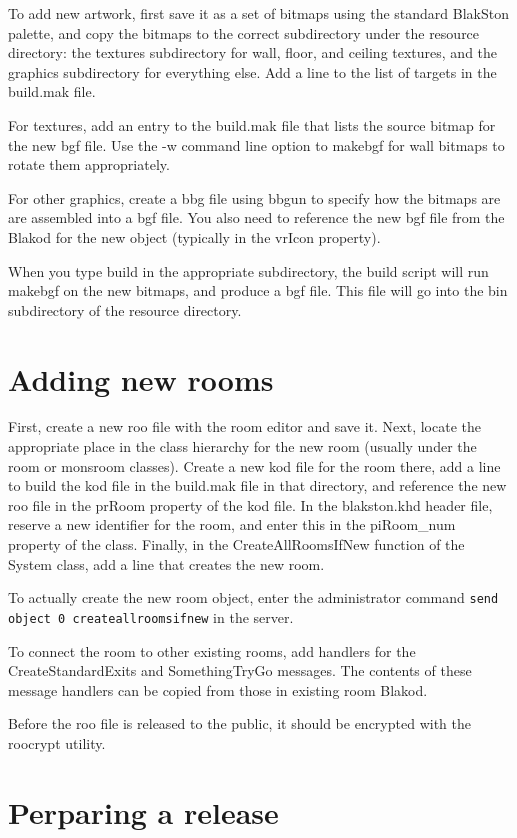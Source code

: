 To add new artwork, first save it as a set of bitmaps using the
standard BlakSton palette, and copy the bitmaps to the correct
subdirectory under the resource directory:  the textures subdirectory
for wall, floor, and ceiling textures, and the graphics subdirectory
for everything else.  Add a line to the list of targets in the
build.mak file.

For textures, add an entry to the build.mak file that lists the source
bitmap for the new bgf file.  Use the -w command line option to
makebgf for wall bitmaps to rotate them appropriately.

For other graphics, create a bbg file using bbgun to specify how the
bitmaps are are assembled into a bgf file.  You also need to reference
the new bgf file from the Blakod for the new object (typically in the
vrIcon property).

When you type build in the appropriate subdirectory, the build script
will run makebgf on the new bitmaps, and produce a bgf file.  This
file will go into the bin subdirectory of the resource directory.

\section{Adding new rooms}

First, create a new roo file with the room editor and save it.  Next,
locate the appropriate place in the class hierarchy for the new room
(usually under the room or monsroom classes).  Create a new kod file
for the room there, add a line to build the kod file in the build.mak
file in that directory, and reference the new roo file in the prRoom
property of the kod file.  In the blakston.khd header file, reserve a
new identifier for the room, and enter this in the piRoom\_num property
of the class.  Finally, in the CreateAllRoomsIfNew function of the
System class, add a line that creates the new room.

To actually create the new room object, enter the administrator
command {\tt send object 0 createallroomsifnew} in the server.

To connect the room to other existing rooms, add handlers for the
CreateStandardExits and SomethingTryGo messages.  The contents of
these message handlers can be copied from those in existing room
Blakod.

Before the roo file is released to the public, it should be encrypted
with the roocrypt utility.

\section{Perparing a release}

